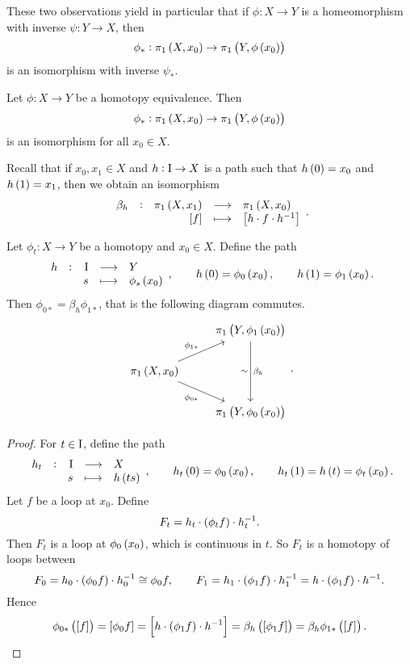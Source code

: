 These two observations yield in particular that if $ \phi : X \to Y $ is a homeomorphism with inverse $ \psi : Y \to X $, then
$$ \phi_* : \pi_1\br{X, x_0} \to \pi_1\br{Y, \phi\br{x_0}} $$
is an isomorphism with inverse $ \psi_* $.

\pagebreak


\begin{proposition}
\label{prop:1.18}
Let $ \phi : X \to Y $ be a homotopy equivalence. Then
$$ \phi_* : \pi_1\br{X, x_0} \to \pi_1\br{Y, \phi\br{x_0}} $$
is an isomorphism for all $ x_0 \in X $.
\end{proposition}

Recall that if $ x_0, x_1 \in X $ and $ h : \mathrm{I} \to X $ is a path such that $ h\br{0} = x_0 $ and $ h\br{1} = x_1 $, then we obtain an isomorphism
$$ \function[\beta_h]{\pi_1\br{X, x_1}}{\pi_1\br{X, x_0}}{\sbr{f}}{\sbr{h \cdot f \cdot h^{-1}}}. $$

\begin{lemma}
\label{lem:1.19}
Let $ \phi_t : X \to Y $ be a homotopy and $ x_0 \in X $. Define the path
$$ \function[h]{\I}{Y}{s}{\phi_s\br{x_0}}, \qquad h\br{0} = \phi_0\br{x_0}, \qquad h\br{1} = \phi_1\br{x_0}. $$
Then $ \phi_{0*} = \beta_h\phi_{1*} $, that is the following diagram commutes.
$$
\begin{tikzcd}
& \pi_1\br{Y, \phi_1\br{x_0}} \arrow{dd}{\beta_h}[swap]{\sim} \\
\pi_1\br{X, x_0} \arrow{ur}{\phi_{1*}} \arrow[swap]{dr}{\phi_{0*}} & \\
& \pi_1\br{Y, \phi_0\br{x_0}}
\end{tikzcd}.
$$
\end{lemma}

\begin{proof}
For $ t \in \mathrm{I} $, define the path
$$ \function[h_t]{\I}{X}{s}{h\br{ts}}, \qquad h_t\br{0} = \phi_0\br{x_0}, \qquad h_t\br{1} = h\br{t} = \phi_t\br{x_0}. $$
Let $ f $ be a loop at $ x_0 $. Define
$$ F_t = h_t \cdot \br{\phi_tf} \cdot h_t^{-1}. $$
Then $ F_t $ is a loop at $ \phi_0\br{x_0} $, which is continuous in $ t $. So $ F_t $ is a homotopy of loops between
$$ F_0 = h_0 \cdot \br{\phi_0f} \cdot h_0^{-1} \cong \phi_0f, \qquad F_1 = h_1 \cdot \br{\phi_1f} \cdot h_1^{-1} = h \cdot \br{\phi_1f} \cdot h^{-1}. $$
Hence
$$ \phi_{0*}\br{\sbr{f}} = \sbr{\phi_0f} = \sbr{h \cdot \br{\phi_1f} \cdot h^{-1}} = \beta_h\br{\sbr{\phi_1f}} = \beta_h\phi_{1*}\br{\sbr{f}}. $$
\end{proof}

